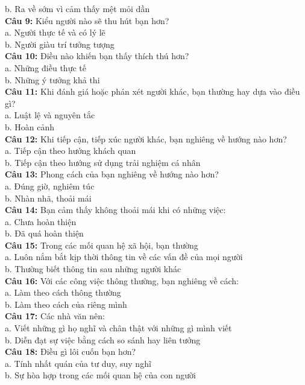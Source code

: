\begin{multicols}{2}
b. Ra về sớm vì cảm thấy mệt mỏi dần \\
\textbf{Câu 9:} Kiểu người nào sẽ thu hút bạn hơn? \\
a. Người thực tế và có lý lẽ \\
b. Người giàu trí tưởng tượng \\
\textbf{Câu 10:} Điều nào khiến bạn thấy thích thú hơn? \\
a. Những điều thực tế \\
b. Những ý tưởng khả thi \\
\textbf{Câu 11:} Khi đánh giá hoặc phán xét người khác, bạn thường hay dựa vào điều gì? \\
a. Luật lệ và nguyên tắc \\
b. Hoàn cảnh \\
\textbf{Câu 12:} Khi tiếp cận, tiếp xúc người khác, bạn nghiêng về hướng nào hơn? \\
a. Tiếp cận theo hướng khách quan \\
b. Tiếp cận theo hướng sử dụng trải nghiệm cá nhân \\
\textbf{Câu 13:} Phong cách của bạn nghiêng về hướng nào hơn? \\
a. Đúng giờ, nghiêm túc \\
b. Nhàn nhã, thoải mái \\
\textbf{Câu 14:} Bạn cảm thấy không thoải mái khi có những việc: \\
a. Chưa hoàn thiện \\
b. Đã quá hoàn thiện \\
\textbf{Câu 15:} Trong các mối quan hệ xã hội, bạn thường \\
a. Luôn nắm bắt kịp thời thông tin về các vấn đề của mọi người \\
b. Thường biết thông tin sau những người khác \\
\textbf{Câu 16:} Với các công việc thông thường, bạn nghiêng về cách: \\
a. Làm theo cách thông thường \\
b. Làm theo cách của riêng mình \\
\textbf{Câu 17:} Các nhà văn nên: \\
a. Viết những gì họ nghĩ và chân thật với những gì mình viết \\
b. Diễn đạt sự việc bằng cách so sánh hay liên tưởng \\
\textbf{Câu 18:} Điều gì lôi cuốn bạn hơn? \\
a. Tính nhất quán của tư duy, suy nghĩ \\
b. Sự hòa hợp trong các mối quan hệ của con người \\

\end{multicols}
